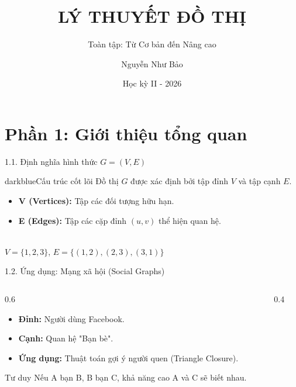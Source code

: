 \documentclass[10pt, xcolor={dvipsnames}]{beamer}
\title{LÝ THUYẾT ĐỒ THỊ}
\subtitle{Toàn tập: Từ Cơ bản đến Nâng cao}
\author{Nguyễn Như Bảo}
\date{Học kỳ II - 2026}
\begin{document}
\frame{\titlepage}

\section{Phần 1: Giới thiệu tổng quan}

\begin{frame}{1.1. Định nghĩa hình thức $G = (V, E)$}
    \begin{detailbox}{darkblue}{Cấu trúc cốt lõi}
        Đồ thị $G$ được xác định bởi tập đỉnh $V$ và tập cạnh $E$.
    \end{detailbox}
    \begin{itemize}
        \item \textbf{V (Vertices):} Tập các đối tượng hữu hạn.
        \item \textbf{E (Edges):} Tập các cặp đỉnh $(u, v)$ thể hiện quan hệ.
    \end{itemize}
    \centering
    \\ \small $V = \{1, 2, 3\}$, $E = \{(1,2), (2,3), (3,1)\}$
\end{frame}

\begin{frame}{1.2. Ứng dụng: Mạng xã hội (Social Graphs)}
    \begin{columns}
        \begin{column}{0.6\textwidth}
            \begin{itemize}
                \item \textbf{Đỉnh:} Người dùng Facebook.
                \item \textbf{Cạnh:} Quan hệ "Bạn bè".
                \item \textbf{Ứng dụng:} Thuật toán gợi ý người quen (Triangle Closure).
            \end{itemize}
            \begin{exampleblock}{Tư duy}
                Nếu A bạn B, B bạn C, khả năng cao A và C sẽ biết nhau.
            \end{exampleblock}
        \end{column}
        \begin{column}{0.4\textwidth}
            \centering
        \end{column}
    \end{columns}
\end{frame}
\end{document}

